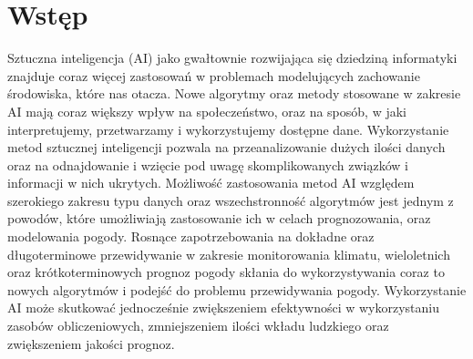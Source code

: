 



\section{Wstęp}

Sztuczna inteligencja (AI) jako gwałtownie rozwijająca się 
dziedziną informatyki znajduje coraz więcej zastosowań w 
problemach modelujących zachowanie środowiska, które nas otacza. 
Nowe algorytmy oraz metody stosowane w zakresie AI mają coraz
większy wpływ na społeczeństwo, oraz na sposób, w jaki interpretujemy,
przetwarzamy i wykorzystujemy dostępne dane. Wykorzystanie metod
sztucznej inteligencji pozwala na przeanalizowanie dużych ilości
danych oraz na odnajdowanie i wzięcie pod uwagę skomplikowanych związków
i informacji w nich ukrytych. Możliwość zastosowania metod AI względem 
szerokiego zakresu typu danych oraz wszechstronność algorytmów jest jednym z 
powodów, które umożliwiają zastosowanie ich w celach prognozowania, oraz modelowania
pogody. Rosnące zapotrzebowania na dokładne oraz długoterminowe przewidywanie
w zakresie monitorowania klimatu, wieloletnich oraz krótkoterminowych prognoz
pogody skłania do wykorzystywania coraz to nowych algorytmów i podejść
do problemu przewidywania pogody. Wykorzystanie AI może skutkować jednocześnie 
zwiększeniem efektywności w wykorzystaniu zasobów obliczeniowych, zmniejszeniem
ilości wkładu ludzkiego oraz zwiększeniem jakości prognoz.

